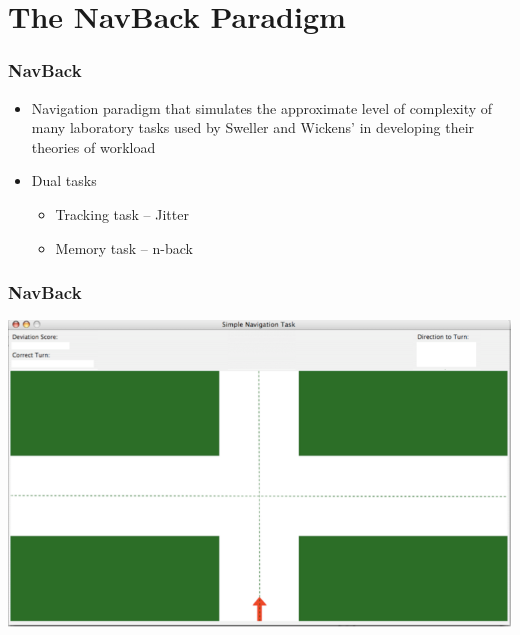 \documentclass{beamer}
\begin{document}
\section{The NavBack Paradigm}

\begin{frame}
	\frametitle{NavBack}
	\begin{itemize}
		\item Navigation paradigm that simulates the approximate level of complexity of many laboratory tasks used by Sweller and Wickens' in developing their theories of workload
		\item Dual tasks
		\begin{itemize}
			\item Tracking task -- Jitter
			\item Memory task -- n-back
		\end{itemize}
	\end{itemize}
\end{frame}

\begin{frame} 
	\frametitle{NavBack}
	\begin{center}
		\includegraphics[width=.75\textwidth]{../zNvBkFigs/NavBack}
	\end{center}


\end{frame}
\end{document}
